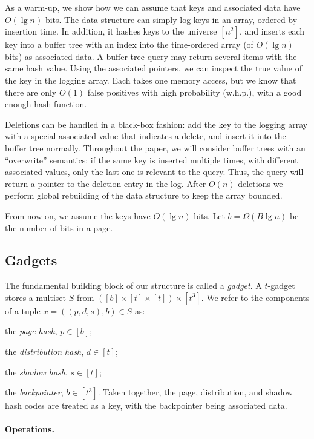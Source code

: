 \documentclass[letterpaper,11pt]{article}
\newenvironment{itemize*}{\vspace{-1ex}\begin{itemize}\setlength{\itemsep}{-0.5ex}\setlength{\parsep}{0pt}}{\end{itemize}}
\begin{document}
As a warm-up, we show how we can assume that keys and associated data
have $O(\lg n)$ bits. The data structure can simply log keys in an
array, ordered by insertion time. In addition, it hashes keys to the
universe $[n^2]$, and inserts each key into a buffer tree with an
index into the time-ordered array (of $O(\lg n)$ bits) as associated
data. A buffer-tree query may return several items with the same hash
value. Using the associated pointers, we can inspect the true value of
the key in the logging array. Each takes one memory access, but we
know that there are only $O(1)$ false positives with high probability
(w.h.p.), with a good enough hash function.

Deletions can be handled in a black-box fashion: add the key to the
logging array with a special associated value that indicates a delete,
and insert it into the buffer tree normally. Throughout the paper, we
will consider buffer trees with an ``overwrite'' semantics: if the
same key is inserted multiple times, with different associated values,
only the last one is relevant to the query. Thus, the query will
return a pointer to the deletion entry in the log. After $O(n)$
deletions we perform global rebuilding of the data structure to keep
the array bounded.

From now on, we assume the keys have $O(\lg n)$ bits. Let $b =
\Omega(B\lg n)$ be the number of bits in a page.


\subsection{Gadgets} \label{sec:gadget}

The fundamental building block of our structure is called a
\emph{gadget}.  A $t$-gadget stores a multiset $S$ from $([b]\times [t]
\times [t])\times [t^3]$. We refer to the components of a tuple
$x=((p,d,s),b) \in S$ as:
\begin{itemize*}
\item the \emph{page hash}, $p\in[b]$;
\item the \emph{distribution hash}, $d \in [t]$;
\item the \emph{shadow hash}, $s \in [t]$;
\item the \emph{backpointer}, $b \in [t^3]$. Taken together, the page,
  distribution, and shadow hash codes are treated as a key, with the
  backpointer being associated data.
\end{itemize*}


\paragraph{Operations.}
\end{document}
